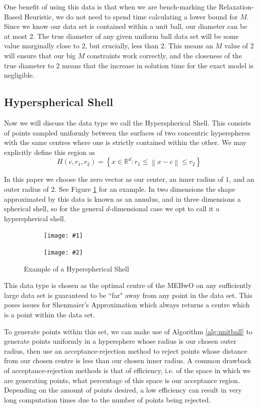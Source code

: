 \documentclass[11pt,twoside]{report}
\newcommand{\norm}[1]{\left\lVert#1\right\rVert} %
\newcommand{\datafigure}[4]{
    \begin{figure}
    \centering
    \begin{subfigure}[b]{0.3333\textwidth}
        \centering
        \texttt{[image: \#1]}
    \end{subfigure}
    \begin{subfigure}[b]{0.3333\textwidth}
        \centering
        \texttt{[image: \#2]}
    \end{subfigure}
    \hfill
    \caption{#3}
    \label{#4}
\end{figure}
}
\theoremstyle{definition}
\numberwithin{theorem}{section}
\numberwithin{definition}{section}
\numberwithin{lemma}{section}
\numberwithin{proposition}{section}
\numberwithin{equation}{section}
\numberwithin{figure}{section}
\begin{document}
One benefit of using this data is that when we are bench-marking the Relaxation-Based Heuristic, we do not need to spend time calculating a lower bound for $M$. Since we know our data set is contained within a unit ball, our diameter can be at most 2. The true diameter of any given uniform ball data set will be some value marginally close to 2, but crucially, less than 2. This means an $M$ value of 2 will ensure that our big $M$ constraints work correctly, and the closeness of the true diameter to 2 means that the increase in solution time for the exact model is negligible.

\subsection{Hyperspherical Shell}
Now we will discuss the data type we call the Hyperspherical Shell. This consists of points sampled uniformly between the surfaces of two concentric hyperspheres with the same centres where one is strictly contained within the other. We may explicitly define this region as
\begin{equation*}
    H(c,r_1,r_2) = \left\{x\in\mathbb{R}^d: r_1 \leq \norm{x-c} \leq r_2\right\}
\end{equation*}

In this paper we choose the zero vector as our center, an inner radius of $1$, and an outer radius of $2$. See Figure \ref{fig:hypshell} for an example. In two dimensions the shape approximated by this data is known as an annulus, and in three dimensions a spherical shell, so for the general $d$-dimensional case we opt to call it a hyperspherical shell.

\datafigure{hyperspherical_shell_2d.png}{hyperspherical_shell_3d.png}{Example of a Hyperspherical Shell}{fig:hypshell}

This data type is chosen as the optimal centre of the MEBwO on any sufficiently large data set is guaranteed to be ``far" away from any point in the data set. This poses issues for Shenmaier's Approximation which always returns a centre which is a point within the data set.

To generate points within this set, we can make use of Algorithm \ref{alg:unitball} to generate points uniformly in a hypersphere whose radius is our chosen outer radius, then use an acceptance-rejection method to reject points whose distance from our chosen centre is less than our chosen inner radius. A common drawback of acceptance-rejection methods is that of efficiency, i.e. of the space in which we are generating points, what percentage of this space is our acceptance region. Depending on the amount of points desired, a low efficiency can result in very long computation times due to the number of points being rejected.
\end{document}
